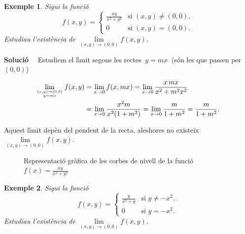 \documentclass[12pt]{article}
\newcommand{\solucio}{\textbf{Soluci{\'o}}\ \ }
\newtheorem{exemple}{Exemple}[subsection]
\begin{document}
\vspace{0.4cm}
\begin{exemple}
Sigui la funci{\'o}
\[
f(x,y)=\begin{cases} \frac{xy}{x^2+y^2} & \text{si $(x,y)\not=
(0,0)$},\\ 0 & \text{si $(x,y)=(0,0)$.}
\end{cases}
\]
Estudiau l'exist{\`e}ncia de $\lim\limits_{(x,y)\to (0,0)} f(x,y)$.
\end{exemple}

\solucio
Estudiem el l{\'\i}mit segons les rectes $\ y=mx\ $ (s{\'o}n les que passen per $(0,0)$)

\begin{align*}
\lim_{(x,y)\to (0,0)\atop y=mx} f(x,y)& =  \lim_{x\to 0} f(x,m x)
= \lim_{x\to 0}\frac{x\, mx}{x^2 + m^2 x^2} \\ & = \lim_{x\to 0}
\frac{x^2 m}{x^2(1 + m^2)} = \lim_{x\to 0}\frac{m}{1+m^2}=
\frac{m}{1+m^2}.
\end{align*}

Aquest l{\'\i}mit dep{\`e}n del pendent de la recta, aleshores no
existeix $\lim\limits_{(x,y)\to (0,0)} f(x,y)$.

\begin{figure}[h!]
\begin{center}
\vspace{-.7cm}
\end{center}
\caption{Representaci{\'o} gr{\`a}fica de les corbes de nivell de la funci{\'o} $f(x)=\frac{xy}{x^2+y^2}$}
\end{figure}



\vspace{0.4cm}
\begin{exemple}
Sigui la funci{\'o}
\[
f(x,y)=\begin{cases} \frac{y}{x^2+y} & \text{si $y\not= -x^2$},\\
0 & \text{si $y=-x^2$.}
\end{cases}
\]
Estudiau l'exist{\`e}ncia de $\lim\limits_{(x,y)\to (0,0)} f(x,y)$.
\end{exemple}
\end{document}
